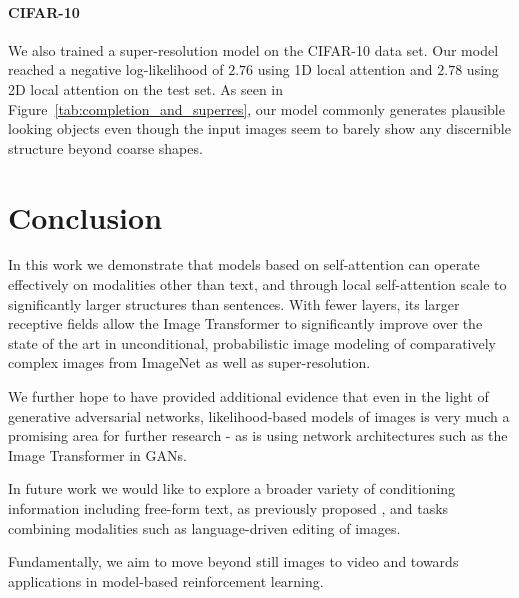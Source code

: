 \documentclass{article}
\begin{document}
\paragraph{CIFAR-10} We also trained a super-resolution model on the CIFAR-10 data set. Our model reached a negative log-likelihood of $2.76$ using 1D local attention and $2.78$ using 2D local attention on the test set. As seen in Figure~\ref{tab:completion_and_superres}, our model commonly generates plausible looking objects even though the input images seem to barely show any discernible structure beyond coarse shapes. 


\section{Conclusion}

In this work we demonstrate that models based on self-attention can operate effectively on modalities other than text, and through local self-attention scale to significantly larger structures than sentences. With fewer layers, its larger receptive fields allow the Image Transformer to significantly improve over the state of the art in unconditional, probabilistic image modeling of comparatively complex images from ImageNet as well as super-resolution.

We further hope to have provided additional evidence that even in the light of generative adversarial networks, likelihood-based models of images is very much a promising area for further research - as is using network architectures such as the Image Transformer in GANs.

In future work we would like to explore a broader variety of conditioning information including free-form text, as previously proposed \citep{Mansimov15}, and tasks combining modalities such as language-driven editing of images.

Fundamentally, we aim to move beyond still images to video \citep{Kalchbrenner16} and towards applications in model-based reinforcement learning.












\end{document}
